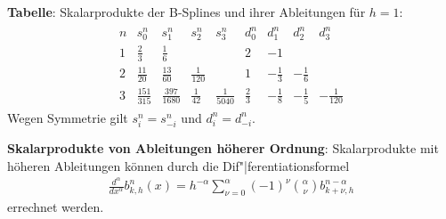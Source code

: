 \textbf{Tabelle}: Skalarprodukte der B-Splines und ihrer Ableitungen für $h = 1$:
\renewcommand*{\arraystretch}{1.3}
\begin{align*}
    \begin{array}{c||cccc|cccc}
        n & s_0^n & s_1^n & s_2^n & s_3^n & d_0^n & d_1^n & d_2^n & d_3^n\\\hline
        1 & \frac{2}{3} & \frac{1}{6} & & & 2 & -1 & &\\
        2 & \frac{11}{20} & \frac{13}{60} & \frac{1}{120} & & 1 & -\frac{1}{3} & -\frac{1}{6} &\\
        3 & \frac{151}{315} & \frac{397}{1680} & \frac{1}{42} & \frac{1}{5040} & \frac{2}{3} &
        -\frac{1}{8} & -\frac{1}{5} & -\frac{1}{120}
    \end{array}
\end{align*}
Wegen Symmetrie gilt $s_i^n = s_{-i}^n$ und $d_i^n = d_{-i}^n$.

\textbf{Skalarprodukte von Ableitungen höherer Ordnung}:
Skalarprodukte mit höheren Ableitungen können durch die Dif"|ferentiationsformel
\begin{align*}
    \frac{d^\alpha}{dx^\alpha} b_{k,h}^n(x)
    = h^{-\alpha} \sum_{\nu=0}^\alpha (-1)^\nu \binom{\alpha}{\nu} b_{k+\nu,h}^{n-\alpha}
\end{align*}
errechnet werden.

\pagebreak
